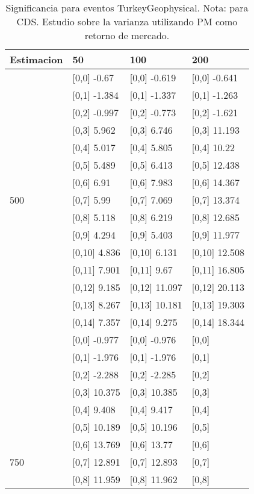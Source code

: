 \begin{table}

\caption{Significancia para eventos TurkeyGeophysical. Nota: para CDS. Estudio sobre la varianza utilizando PM como retorno de mercado.}
\centering
\begin{tabular}[t]{llll}
\toprule
Estimacion & 50 & 100 & 200\\
\midrule
 & {}[0,0] -0.67 & {}[0,0] -0.619 & {}[0,0] -0.641\\
 & {}[0,1] -1.384 & {}[0,1] -1.337 & {}[0,1] -1.263\\
 & {}[0,2] -0.997 & {}[0,2] -0.773 & {}[0,2] -1.621\\
 & {}[0,3] 5.962 & {}[0,3] 6.746 & {}[0,3] 11.193\\
 & {}[0,4] 5.017 & {}[0,4] 5.805 & {}[0,4] 10.22\\
\addlinespace
 & {}[0,5] 5.489 & {}[0,5] 6.413 & {}[0,5] 12.438\\
 & {}[0,6] 6.91 & {}[0,6] 7.983 & {}[0,6] 14.367\\
500 & {}[0,7] 5.99 & {}[0,7] 7.069 & {}[0,7] 13.374\\
 & {}[0,8] 5.118 & {}[0,8] 6.219 & {}[0,8] 12.685\\
 & {}[0,9] 4.294 & {}[0,9] 5.403 & {}[0,9] 11.977\\
\addlinespace
 & {}[0,10] 4.836 & {}[0,10] 6.131 & {}[0,10] 12.508\\
 & {}[0,11] 7.901 & {}[0,11] 9.67 & {}[0,11] 16.805\\
 & {}[0,12] 9.185 & {}[0,12] 11.097 & {}[0,12] 20.113\\
 & {}[0,13] 8.267 & {}[0,13] 10.181 & {}[0,13] 19.303\\
 & {}[0,14] 7.357 & {}[0,14] 9.275 & {}[0,14] 18.344\\
\addlinespace
 & {}[0,0] -0.977 & {}[0,0] -0.976 & {}[0,0]\\
 & {}[0,1] -1.976 & {}[0,1] -1.976 & {}[0,1]\\
 & {}[0,2] -2.288 & {}[0,2] -2.285 & {}[0,2]\\
 & {}[0,3] 10.375 & {}[0,3] 10.385 & {}[0,3]\\
 & {}[0,4] 9.408 & {}[0,4] 9.417 & {}[0,4]\\
\addlinespace
 & {}[0,5] 10.189 & {}[0,5] 10.196 & {}[0,5]\\
 & {}[0,6] 13.769 & {}[0,6] 13.77 & {}[0,6]\\
750 & {}[0,7] 12.891 & {}[0,7] 12.893 & {}[0,7]\\
 & {}[0,8] 11.959 & {}[0,8] 11.962 & {}[0,8]\\

\end{tabular}
\end{table}
